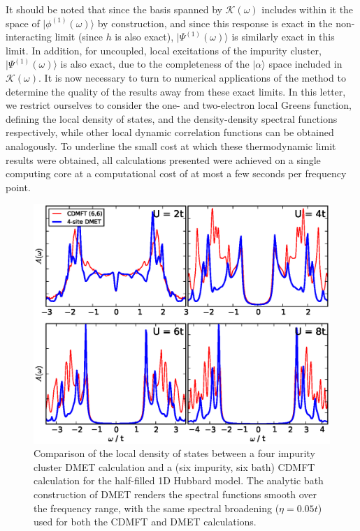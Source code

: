 \documentclass[aps,showpacs,twocolumn,nobibnotes]{revtex4}
\begin{document}
It should be noted that since the basis spanned by $\mathcal{K}(\omega)$ includes within it the space of $|\phi^{(1)}(\omega) \rangle$ by construction, 
and since this response is exact in the non-interacting limit (since $h$ is also exact), $|\Psi^{(1)}(\omega)\rangle$ is similarly exact in this limit.
In addition, for uncoupled, local excitations of the impurity cluster, $|\Psi^{(1)}(\omega)\rangle$ is also exact, due to the completeness of the 
$|\alpha \rangle$ space included in $\mathcal{K}(\omega)$. It is now necessary to turn to numerical applications of the method to determine the
quality of the results away from these exact limits. 
In this letter, we restrict ourselves to consider the one- and two-electron local Greens function,
defining the local density of states, and the density-density spectral functions respectively, while other local dynamic correlation functions can be obtained analogously.
To underline the small cost at which these thermodynamic limit results were obtained, all calculations presented were achieved on a single computing core at a 
computational cost of at most a few seconds per frequency point.

\begin{figure}
\begin{center}
    \vspace{-2mm}
\includegraphics[scale=0.475]{Plots/1D_Spectra/1D_Hub_Spectra.eps}
\end{center}
    \vspace{-5mm}
\caption{Comparison of the local density of states between a four impurity cluster DMET calculation and a
(six impurity, six bath) CDMFT calculation for the half-filled 1D Hubbard model. The analytic bath construction
of DMET renders the spectral functions smooth over the frequency range, with the same spectral broadening ($\eta=0.05t$) used for
both the CDMFT and DMET calculations.}
\label{1D_DOS}
\end{figure}
\end{document}
